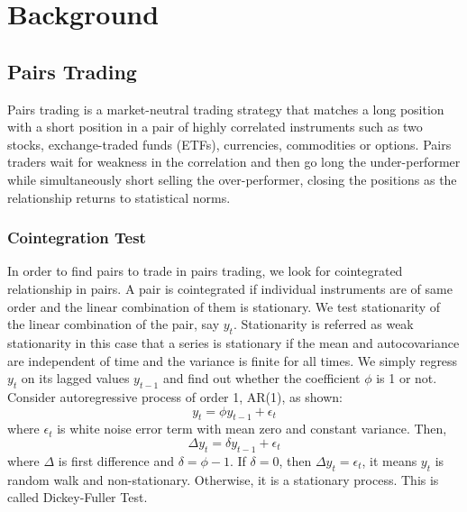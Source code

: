 \chapter{Background}
\label{chap:background}
\nocite{*}


\section{Pairs Trading}

Pairs trading is a market-neutral trading strategy that matches a long position with a short position in a pair of highly correlated instruments such as two stocks, exchange-traded funds (ETFs), currencies, commodities or options. Pairs traders wait for weakness in the correlation and then go long the under-performer while simultaneously short selling the over-performer, closing the positions as the relationship returns to statistical norms.\cite{investo:pairs}


\subsection{Cointegration Test}

In order to find pairs to trade in pairs trading, we look for cointegrated relationship in pairs. A pair is cointegrated if individual instruments are of same order and the linear combination of them is stationary. We test stationarity of the linear combination of the pair, say \(y_t\). Stationarity is referred as weak stationarity in this case that a series is stationary if the mean and autocovariance are independent of time and the variance is finite for all times.\cite{wiki:stationarity} We simply regress \(y_t\) on its lagged values \(y_{t-1}\) and find out whether the coefficient \(\phi\) is 1 or not. Consider autoregressive process of order 1, AR(1), as shown:\cite{study:coint}
\begin{equation}
y_t = \phi y_{t-1} + \epsilon_t
\end{equation}
where \(\epsilon_t\) is white noise error term with mean zero and constant variance. Then,
\begin{equation}
\Delta y_t = \delta y_{t-1} + \epsilon_t
\end{equation}
where \(\Delta\) is first difference and \(\delta = \phi - 1\). If \(\delta = 0\), then \(\Delta y_t = \epsilon_t \), it means \(y_t\) is random walk and non-stationary. Otherwise, it is a stationary process. This is called Dickey-Fuller Test.


